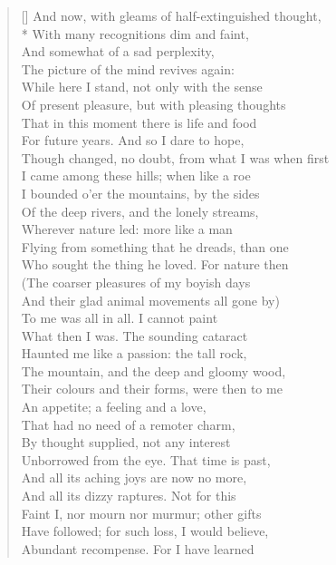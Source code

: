 \documentclass[MAIN]{subfiles}
\begin{document}
\begin{verse}[\versewidth]
And now, with gleams of half-extinguished thought,\\*
With many recognitions dim and faint,\\
And somewhat of a sad perplexity,\\
The picture of the mind revives again:\\ 
While here I stand, not only with the sense\\
Of present pleasure, but with pleasing thoughts\\ 
That in this moment there is life and food\\
For future years. And so I dare to hope,\\
Though changed, no doubt, from what I was when first\\
I came among these hills; when like a roe\\
I bounded o'er the mountains, by the sides\\
Of the deep rivers, and the lonely streams,\\
Wherever nature led: more like a man\\
Flying from something that he dreads, than one\\ 
Who sought the thing he loved. For nature then\\
(The coarser pleasures of my boyish days\\
And their glad animal movements all gone by)\\ 
To me was all in all. I cannot paint\\
What then I was. The sounding cataract\\ 
Haunted me like a passion: the tall rock,\\ 
The mountain, and the deep and gloomy wood,\\
Their colours and their forms, were then to me\\ 
An appetite; a feeling and a love,\\
That had no need of a remoter charm,\\ 
By thought supplied, not any interest\\
Unborrowed from the eye. That time is past,\\ 
And all its aching joys are now no more,\\
And all its dizzy raptures. Not for this\\
Faint I, nor mourn nor murmur; other gifts\\ 
Have followed; for such loss, I would believe,\\
Abundant recompense. For I have learned\\

\end{verse}
\end{document}
